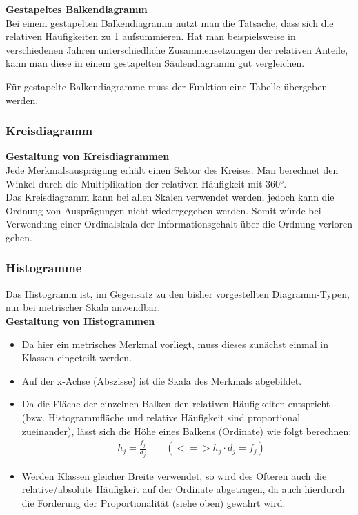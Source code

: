 \documentclass[a4paper]{article}
\newcommand\dangersign{%
 \makebox[1.8em][c]{%
 \makebox[0pt][c]{\raisebox{.15em}{\small!}}%
 \makebox[0pt][c]{\color{red}\Large$\triangle$}}}%
\begin{document}
\noindent\textbf{Gestapeltes Balkendiagramm}\\
Bei einem gestapelten Balkendiagramm nutzt man die Tatsache, dass sich die relativen Häufigkeiten zu 1 aufsummieren. Hat man beispielsweise in verschiedenen Jahren unterschiedliche Zusammensetzungen der relativen Anteile, kann man diese in einem gestapelten Säulendiagramm gut vergleichen.\\

\noindent {}

\noindent \dangersign Für gestapelte Balkendiagramme muss der Funktion eine Tabelle übergeben werden.

\subsubsection{Kreisdiagramm}
\textbf{Gestaltung von Kreisdiagrammen}\\
Jede Merkmalsausprägung erhält einen Sektor des Kreises. Man berechnet den Winkel durch die Multiplikation der relativen Häufigkeit mit 360°.\\
Das Kreisdiagramm kann bei allen Skalen verwendet werden, jedoch kann die Ordnung von Ausprägungen nicht wiedergegeben werden. Somit würde bei Verwendung einer Ordinalskala der Informationsgehalt über die Ordnung verloren gehen.\\

\noindent {}

\subsubsection{Histogramme}
Das Histogramm ist, im Gegensatz zu den bisher vorgestellten Diagramm-Typen, nur bei metrischer Skala anwendbar.\\
\textbf{Gestaltung von Histogrammen}
\begin{itemize}
    \item Da hier ein metrisches Merkmal vorliegt, muss dieses zunächst einmal in Klassen eingeteilt werden.
    \item Auf der x-Achse (Abszisse) ist die Skala des Merkmals abgebildet.
    \item Da die Fläche der einzelnen Balken den relativen Häufigkeiten entspricht (bzw. Histogrammfläche und relative Häufigkeit sind proportional zueinander), lässt sich die Höhe eines Balkens (Ordinate) wie folgt berechnen:
    \begin{align*} 
    &h_j = \frac{f_j}{d_j} \qquad (<=> h_j\cdot d_j = f_j) 
    \end{align*}
    \item Werden Klassen gleicher Breite verwendet, so wird des Öfteren auch die relative/absolute Häufigkeit auf der Ordinate abgetragen, da auch hierdurch die Forderung der Proportionalität (siehe oben) gewahrt wird.
\end{itemize}
\end{document}
